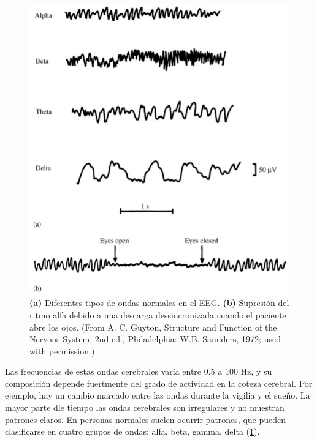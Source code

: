 \begin{figure}
\centering
\includegraphics[width=0.7\linewidth]{figura_4.png} 
\caption{\textbf{(a)} Diferentes tipos de ondas normales en el EEG.
\textbf{(b)} Supresi\'on del ritmo alfa debido a una descarga dessincronizada cuando
el paciente abre los ojos.
(From A. C. Guyton, Structure and Function of the Nervous System, 2nd ed.,
Philadelphia: W.B. Saunders, 1972; used with permission.)
}
\label{ritmos}
\end{figure}


Las frecuencias de estas ondas cerebrales var\'ia entre 0.5 a 100 Hz, y su composici\'on 
depende fuertmente del grado de actividad en la coteza cerebral.
Por ejemplo, hay un cambio marcado entre las ondas durante la vigilia y el sue\~no.
La mayor parte dle tiempo las ondas cerebrales son irregulares y no muestran patrones claros.
En personas normales suelen ocurrir patrones, que pueden clasificarse en cuatro grupos
de ondas: alfa, beta, gamma, delta (\ref{ritmos}).


